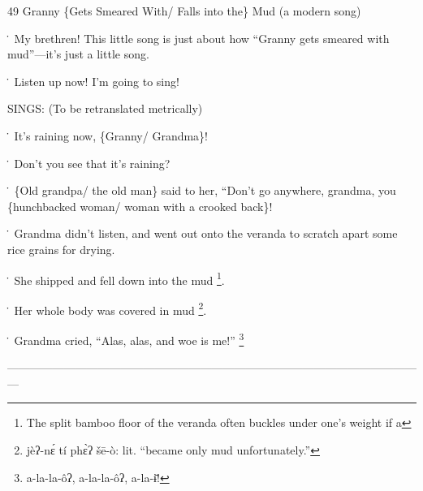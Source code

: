 
49 Granny \{Gets Smeared With/ Falls into the\} Mud (a modern song)

\. My brethren!  This little song is just about how ``Granny gets smeared with
mud''---it's just a little song.

\. Listen up now!  I'm going to sing!

SINGS: (To be retranslated metrically)

\. It's raining now, \{Granny/ Grandma\}!

\. Don't you see that it's raining?

\. \{Old grandpa/ the old man\} said to her, ``Don't go anywhere, grandma, you
\{hunchbacked woman/ woman with a crooked back\}!

\. Grandma didn't listen, and went out onto the veranda to scratch apart some rice
grains for drying.

\. She shipped and fell down into the mud \footnote{The split bamboo floor of the veranda often buckles under one's weight if a}.

\. Her whole body was covered in mud \footnote{jèʔ-nɛ́ tí phɛ̀ʔ šē-ò: lit. ``became only mud unfortunately.''}.

\. Grandma cried, ``Alas, alas, and woe is me!'' \footnote{a-la-la-ôʔ, a-la-la-ôʔ, a-la-ɨ̄!}

---------------------------------------------------------------------------------------------------------------

